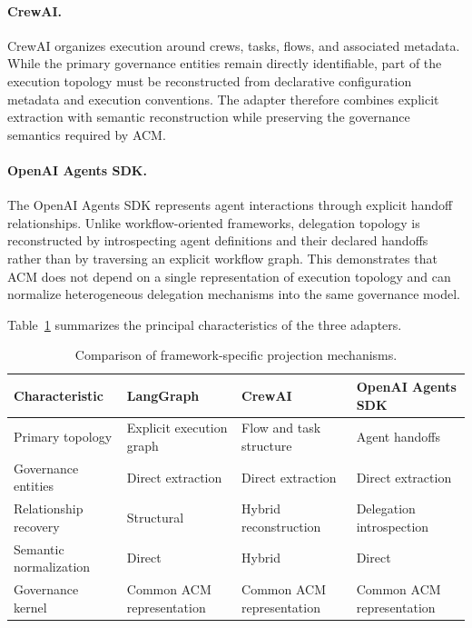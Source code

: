 \documentclass[10pt]{article}
\begin{document}
\paragraph{CrewAI.}

CrewAI organizes execution around crews, tasks, flows, and associated metadata. While the primary governance entities remain directly identifiable, part of the execution topology must be reconstructed from declarative configuration metadata and execution conventions. The adapter therefore combines explicit extraction with semantic reconstruction while preserving the governance semantics required by ACM.

\paragraph{OpenAI Agents SDK.}

The OpenAI Agents SDK represents agent interactions through explicit handoff relationships. Unlike workflow-oriented frameworks, delegation topology is reconstructed by introspecting agent definitions and their declared handoffs rather than by traversing an explicit workflow graph. This demonstrates that ACM does not depend on a single representation of execution topology and can normalize heterogeneous delegation mechanisms into the same governance model.

Table~\ref{tab:framework_projection_summary} summarizes the principal characteristics of the three adapters.

\begin{table}[t]
	\centering
	\caption{Comparison of framework-specific projection mechanisms.}
	\label{tab:framework_projection_summary}
	\small
	\begin{tabular}{p{3.0cm}p{2.6cm}p{2.8cm}p{2.8cm}}
		\toprule
		\textbf{Characteristic} &
		\textbf{LangGraph} &
		\textbf{CrewAI} &
		\textbf{OpenAI Agents SDK} \\
		\midrule
		Primary topology &
		Explicit execution graph &
		Flow and task structure &
		Agent handoffs \\
		Governance entities &
		Direct extraction &
		Direct extraction &
		Direct extraction \\
		Relationship recovery &
		Structural &
		Hybrid reconstruction &
		Delegation introspection \\
		Semantic normalization &
		Direct &
		Hybrid &
		Direct \\
		Governance kernel &
		Common ACM representation &
		Common ACM representation &
		Common ACM representation \\
		\bottomrule
	\end{tabular}
\end{table}
\end{document}
